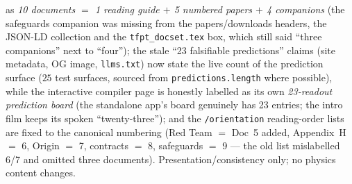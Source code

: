 \documentclass[11pt]{article}
\begin{document}
\begin{itemize}[leftmargin=1.5em]
as \emph{10 documents $=$ 1 reading guide $+$ 5 numbered papers $+$ 4 companions} (the
safeguards companion was missing from the papers/downloads headers, the JSON-LD collection
and the \texttt{tfpt\_docset.tex} box, which still said ``three companions'' next to
``four''); the stale ``23 falsifiable predictions'' claims (site metadata, OG image,
\texttt{llms.txt}) now state the live count of the prediction surface ($25$ test surfaces,
sourced from \texttt{predictions.length} where possible), while the interactive compiler
page is honestly labelled as its own \emph{23-readout prediction board} (the standalone
app's board genuinely has 23 entries; the intro film keeps its spoken ``twenty-three'');
and the \texttt{/orientation} reading-order lists are fixed to the canonical numbering
(Red Team $=$ Doc~5 added, Appendix~H $=$ 6, Origin $=$ 7, contracts $=$ 8, safeguards $=$ 9
--- the old list mislabelled 6/7 and omitted three documents). Presentation/consistency
only; no physics content changes.
\end{itemize}
\end{document}
